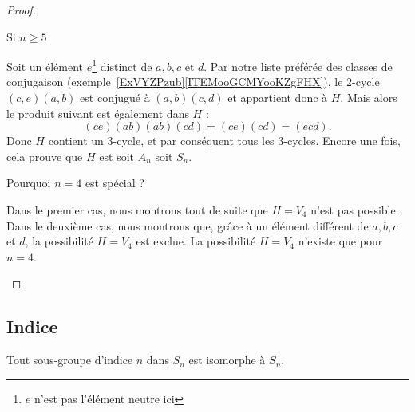 \begin{proof}
\begin{subproof}
\begin{subproof}
                \item[Si \( n\geq 5\)]

                    Soit un élément \( e\)\footnote{\( e\) n'est pas l'élément neutre ici} distinct de \( a,b,c\) et \( d\). Par notre liste préférée des classes de conjugaison (exemple~\ref{ExVYZPzub}\ref{ITEMooGCMYooKZgFHX}), le \( 2\)-cycle \( (c,e)(a,b)\) est conjugué à \( (a,b)(c,d)\) et appartient donc à \( H\). Mais alors le produit suivant est également dans \( H\) :
                    \begin{equation}
                        (ce)(ab)(ab)(cd)=(ce)(cd)=(ecd).
                    \end{equation}
                    Donc \( H\) contient un \( 3\)-cycle, et par conséquent tous les \( 3\)-cycles. Encore une fois, cela prouve que \( H\) est soit \( A_n\) soit \( S_n\).

        \item[Pourquoi \( n=4\) est spécial ?]

            Dans le premier cas, nous montrons tout de suite que \( H=V_4\) n'est pas possible. Dans le deuxième cas, nous montrons que, grâce à un élément différent de \( a,b,c\) et \( d\), la possibilité \( H=V_4\) est exclue. La possibilité \( H=V_4\) n'existe que pour \( n=4\).

    \end{subproof}
    \end{subproof}

\end{proof}

\subsection{Indice}

\begin{theorem}
    Tout sous-groupe d'indice \( n\) dans \( S_n\) est isomorphe à \( S_n\).
\end{theorem}

